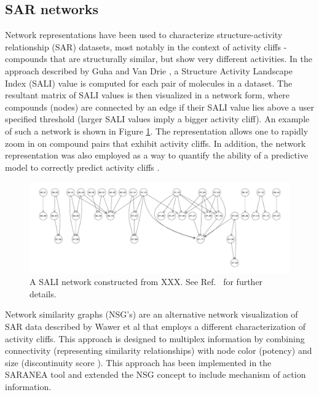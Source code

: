 \documentclass[]{book}
\begin{document}
\subsection{SAR networks}
\label{sec:sar-networks}

Network representations have been used to characterize
structure-activity relationship (SAR) datasets, most notably in the
context of activity cliffs \cite{Maggiora:2006aa} - compounds that are
structurally similar, but show very different activities. In the approach
described by Guha and Van Drie \cite{Guha:2008aa}, a Structure
Activity Landscape Index (SALI) value is computed for each pair of
molecules in a dataset. The resultant matrix of SALI values is then
visualized in a network form, where compounds (nodes) are connected by
an edge if their SALI value lies above a user specified threshold
(larger SALI values imply a bigger activity cliff). An example of such
a network is shown in Figure \ref{fig:salinet}. The representation
allows one to rapidly zoom in on compound pairs that exhibit activity
cliffs. In addition, the network representation was also employed as a
way to quantify the ability of a predictive model to correctly predict
activity cliffs \cite{Guha:2008ab}.

\begin{figure}[h]
  \centering
  \includegraphics[width=\linewidth]{img/salinet} 
  \caption{A SALI network constructed from XXX. See Ref.~\cite{Guha:2008aa} for further details.}
  \label{fig:salinet}
\end{figure}

Network similarity graphs (NSG's) are an alternative network
visualization of SAR data described by Wawer et al \cite{Wawer:2008aa}
that employs a different characterization of activity cliffs. This
approach is designed to multiplex information by combining
connectivity (representing similarity relationships) with node color
(potency) and size (discontinuity score \cite{Peltason:2007aa}). This
approach has been implemented in the SARANEA tool
\cite{Lounkine:2010fk} and extended \cite{Iyer:2011ij} the NSG concept
to include mechanism of action information.
\end{document}
